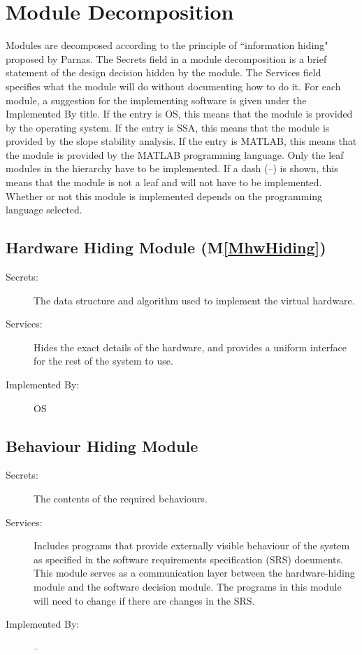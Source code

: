 \documentclass[12pt]{article}
\begin{document}
\section{Module Decomposition}
\label{Sec:ModuDeco}
Modules are decomposed according to the principle of ``information hiding" proposed by Parnas. The Secrets field in a module decomposition is a brief statement of the design decision hidden by the module. The Services field specifies what the module will do without documenting how to do it. For each module, a suggestion for the implementing software is given under the Implemented By title. If the entry is OS, this means that the module is provided by the operating system. If the entry is SSA, this means that the module is provided by the slope stability analysis. If the entry is MATLAB, this means that the module is provided by the MATLAB programming language. Only the leaf modules in the hierarchy have to be implemented. If a dash (--) is shown, this means that the module is not a leaf and will not have to be implemented. Whether or not this module is implemented depends on the programming language selected.
\subsection{Hardware Hiding Module (M\ref{MhwHiding})}
\label{Sec:HardHidiModu()}
\begin{description}
\item[Secrets:]The data structure and algorithm used to implement the virtual hardware.
\item[Services:]Hides the exact details of the hardware, and provides a uniform interface for the rest of the system to use.
\item[Implemented By:]OS
\end{description}
\subsection{Behaviour Hiding Module}
\label{Sec:BehaHidiModu}
\begin{description}
\item[Secrets:]The contents of the required behaviours.
\item[Services:]Includes programs that provide externally visible behaviour of the system as specified in the software requirements specification (SRS) documents. This module serves as a communication layer between the hardware-hiding module and the software decision module. The programs in this module will need to change if there are changes in the SRS.
\item[Implemented By:]--
\end{description}
\end{document}

